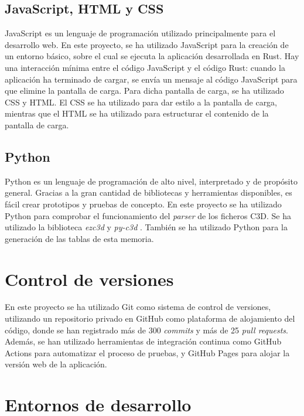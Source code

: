 \subsection{JavaScript, HTML y CSS}

JavaScript es un lenguaje de programación utilizado principalmente para el desarrollo web. En este proyecto, se ha utilizado JavaScript para la creación de un entorno básico, sobre el cual se ejecuta la aplicación desarrollada en Rust. Hay una interacción mínima entre el código JavaScript y el código Rust: cuando la aplicación ha terminado de cargar, se envía un mensaje al código JavaScript para que elimine la pantalla de carga. Para dicha pantalla de carga, se ha utilizado CSS y HTML. El CSS se ha utilizado para dar estilo a la pantalla de carga, mientras que el HTML se ha utilizado para estructurar el contenido de la pantalla de carga.

\subsection{Python}

Python es un lenguaje de programación de alto nivel, interpretado y de propósito general. Gracias a la gran cantidad de bibliotecas y herramientas disponibles, es fácil crear prototipos y pruebas de concepto. En este proyecto se ha utilizado Python para comprobar el funcionamiento del \textit{parser} de los ficheros \ac{C3D}. Se ha utilizado la biblioteca \textit{ezc3d} \autocite{PyomecaEzc3d2025} y \textit{py-c3d} \autocite{EmbodiedCognitionPyc3d2025}. También se ha utilizado Python para la generación de las tablas de esta memoria.

\section{Control de versiones}

En este proyecto se ha utilizado Git como sistema de control de versiones, utilizando un repositorio privado en GitHub como plataforma de alojamiento del código, donde se han registrado más de 300 \textit{commits} y más de 25 \textit{pull requests}. Además, se han utilizado herramientas de integración continua como GitHub Actions para automatizar el proceso de pruebas, y GitHub Pages para alojar la versión web de la aplicación.

\section{Entornos de desarrollo}


